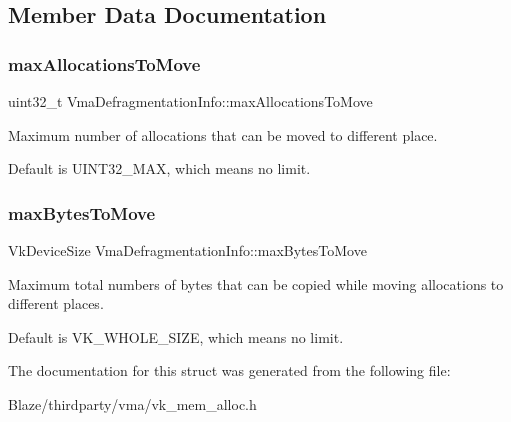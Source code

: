 \subsection{Member Data Documentation}
\mbox{\label{structVmaDefragmentationInfo_aa7c7304e13c71f604c907196c4e28fbc}} 
\subsubsection{\texorpdfstring{max\+Allocations\+To\+Move}{maxAllocationsToMove}}
{\footnotesize\ttfamily uint32\+\_\+t Vma\+Defragmentation\+Info\+::max\+Allocations\+To\+Move}



Maximum number of allocations that can be moved to different place. 

Default is {\ttfamily U\+I\+N\+T32\+\_\+\+M\+AX}, which means no limit. \mbox{\label{structVmaDefragmentationInfo_acb311c940a777270e67e1b81c5ab6a1d}} 
\subsubsection{\texorpdfstring{max\+Bytes\+To\+Move}{maxBytesToMove}}
{\footnotesize\ttfamily Vk\+Device\+Size Vma\+Defragmentation\+Info\+::max\+Bytes\+To\+Move}



Maximum total numbers of bytes that can be copied while moving allocations to different places. 

Default is {\ttfamily V\+K\+\_\+\+W\+H\+O\+L\+E\+\_\+\+S\+I\+ZE}, which means no limit. 

The documentation for this struct was generated from the following file\+:\begin{DoxyCompactItemize}
\item 
Blaze/thirdparty/vma/vk\+\_\+mem\+\_\+alloc.\+h\end{DoxyCompactItemize}
